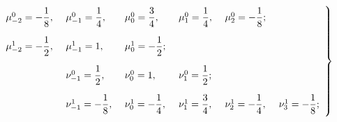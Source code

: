 \noindent
{ %
\begin{equation}
\left.
{\begin{array}{llllll}
\mu_{-2}^0=-\fr{1}{8},&\ \mu_{-1}^0=\fr{1}{4},&\ \mu_{0}^0=\fr{3}{4},&\ \mu_{1}^0=\fr{1}{4},
&\ \mu_{2}^0=-\fr{1}{8}; &\ \\[12pt]
\mu_{-2}^1=-\fr{1}{2},&\ \mu_{-1}^1=1,&\ \mu_{0}^1=-\fr{1}{2}; &\ &\ &\ \\[12pt]
&\ \nu_{-1}^0=\fr{1}{2},&\ \nu_{0}^0=1,&\ \nu_{1}^0=\fr{1}{2}; &\ &\ \\[12pt]
&\ \nu_{-1}^1=-\fr{1}{8},&\ \nu_{0}^1=-\fr{1}{4},&\ \nu_{1}^1=\fr{3}{4},&\ \nu_{2}^1=-\fr{1}{4},&\
\nu_{3}^1=-\fr{1}{8};
\end{array}}
\right\}\!\!\!
\label{eq36}
\end{equation}

}

